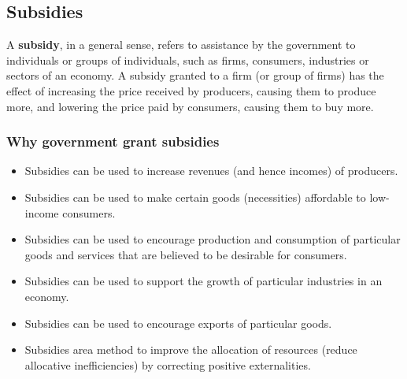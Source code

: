 \documentclass[a4paper,12pt]{article}
\newcommand{\needbold}[1]{\textcolor{red!70!black}{\textbf{#1}}}
\begin{document}
\subsection{Subsidies}
A \needbold{subsidy}, in a general sense, refers to assistance by the government to individuals or groups of individuals, such as firms, consumers, industries or sectors of an economy.
A subsidy granted to a firm (or group of firms) has the effect of increasing the price received by producers, causing them to produce more, and lowering the price paid by consumers, causing them to buy more.
\subsubsection*{Why government grant subsidies}
\begin{itemize}
  \item Subsidies can be used to increase revenues (and hence incomes) of producers.
  \item Subsidies can be used to make certain goods (necessities) affordable to low-income consumers.
  \item Subsidies can be used to encourage production and consumption of particular goods and services that are believed to be desirable for consumers.
  \item Subsidies can be used to support the growth of particular industries in an economy.  
  \item Subsidies can be used to encourage exports of particular goods.
  \item Subsidies area method to improve the allocation of resources (reduce allocative inefficiencies) by correcting positive externalities.
\end{itemize}
\end{document}
